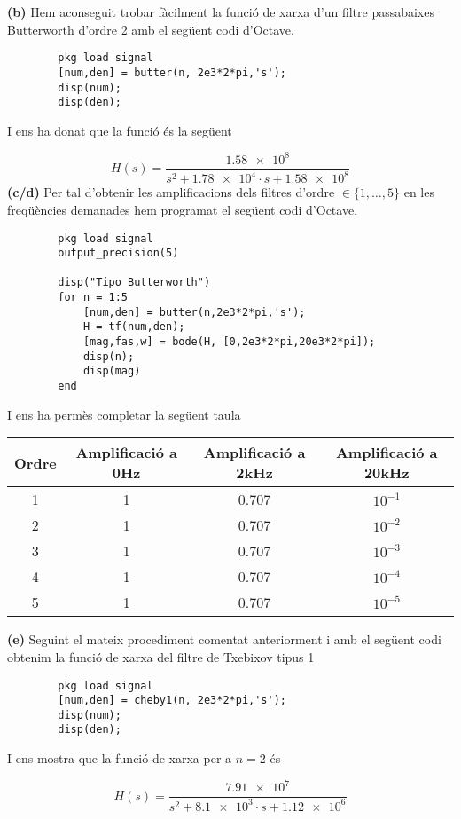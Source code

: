 \documentclass[12pt, a4papre]{article}
\begin{document}
	\textbf{(b)} Hem aconseguit trobar fàcilment la funció de xarxa d'un filtre passabaixes Butterworth d'ordre 2 amb el següent codi d'Octave.
	\begin{lstlisting}
		pkg load signal
		[num,den] = butter(n, 2e3*2*pi,'s');
		disp(num);
		disp(den);
	\end{lstlisting}
	
	I ens ha donat que la funció és la següent

	\[
		H(s)=\frac{\num{1.58e8}}{s^2 +\num{1.78e4} \cdot s +\num{1.58e8}}
	\]
	\newpage
	\textbf{(c/d)} Per tal d'obtenir les amplificacions dels filtres d'ordre $\in\{1, \hdots , 5\}$ en les freqüències demanades hem programat el següent codi d'Octave.	
	\begin{lstlisting}
		pkg load signal
		output_precision(5)

		disp("Tipo Butterworth")
		for n = 1:5
			[num,den] = butter(n,2e3*2*pi,'s');
			H = tf(num,den);
			[mag,fas,w] = bode(H, [0,2e3*2*pi,20e3*2*pi]);
			disp(n);
			disp(mag)
		end
	\end{lstlisting}
	
	I ens ha permès completar la següent taula
	\begin{center}
		\begin{tabular}{ |c | c  c  c|}
			\hline
			Ordre & Amplificació a 0Hz	& Amplificació a 2kHz 	& Amplificació a 20kHz \\ \hline
			1 &1 		 				& 0.707  				& $10^{-1}	$		\\ 
			2 &1 						& 0.707				& $10^{-2}	$		\\
			3 &1 						& 0.707				& $10^{-3}	$		\\
			4 &1 						& 0.707				& $10^{-4}	$		\\
			5 &1 						& 0.707				& $10^{-5}	$		\\
			\hline
		\end{tabular}
	\end{center}
	
	\textbf{(e)} Seguint el mateix procediment comentat anteriorment i amb el següent codi obtenim la funció de xarxa del filtre de Txebixov tipus 1
	\begin{lstlisting}
		pkg load signal
		[num,den] = cheby1(n, 2e3*2*pi,'s');
		disp(num);
		disp(den);
	\end{lstlisting}
	
	I ens mostra que la funció de xarxa per a $n=2$ és

	\[
		H(s)=\frac{\num{7.91e7}}{s^2 +\num{8.1e3} \cdot s +\num{1.12e6}}
	\]
	
\end{document}
